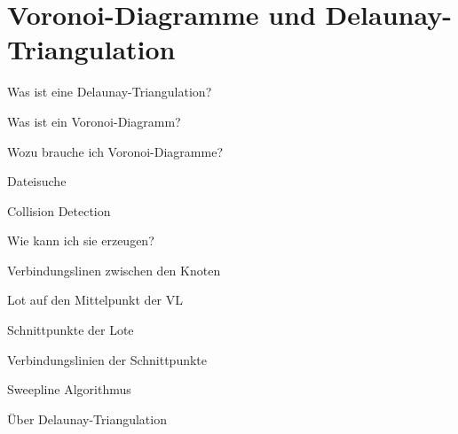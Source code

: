 \chapter{Voronoi-Diagramme und Delaunay-Triangulation}
\label{chap:voronoi}

\begin{itemize*}
\item Was ist eine Delaunay-Triangulation?
\item Was ist ein Voronoi-Diagramm?
\item Wozu brauche ich Voronoi-Diagramme?
	\begin{itemize*}
	\item Dateisuche
	\item Collision Detection
	\end{itemize*}
\item Wie kann ich sie erzeugen?
	\begin{itemize*}
	\item Verbindungslinen zwischen den Knoten
	\item Lot auf den Mittelpunkt der VL
	\item Schnittpunkte der Lote
	\item Verbindungslinien der Schnittpunkte
	\end{itemize*}
	\begin{itemize*}
	\item Sweepline Algorithmus \cite{Fortune1987}
	\item Über Delaunay-Triangulation \cite{Dwyer1987}
	\end{itemize*}
	
\end{itemize*}

